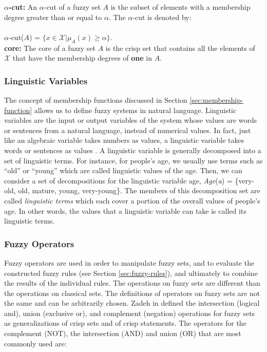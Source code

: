 \documentclass[11pt]{article}
\begin{document}
\textbf{$\alpha$-cut:} An $\alpha$-cut of a fuzzy set $\textit{A}$ is the subset
of elements with a membership degree greater than or equal to $\alpha$. The
$\alpha$-cut is denoted by:\\ \\$\alpha$-cut($\textit{A}$) = $\{\textit{x} \in
\mathcal{X} | \mu_A(\textit{x}) \geqslant \alpha\}$.\\

\textbf{core:} The core of a fuzzy set $\textit{A}$ is the crisp set that
contains all the elements of $\mathcal{X}$ that have the membership degrees of
\textbf{one} in $\textit{A}$.

\subsubsection{Linguistic Variables}
\label{sec:linguistic-variables}

The concept of membership functions discussed in Section
\ref{sec:membership-function} allows us to define fuzzy systems in natural
language. Linguistic variables are the input or output variables of the system
whose values are words or sentences from a natural language, instead of
numerical values. In fact, just like an algebraic variable takes numbers as
values, a linguistic variable takes words or sentences as values
\cite{zimmermann:fuzzy-sets}. A linguistic variable is generally decomposed into
a set of linguistic terms. For instance, for people's age, we usually use terms
such as ``old'' or ``young'' which are called linguistic values of the age.
Then, we can consider a set of decompositions for the linguistic variable age,
\textit{Age}(\textit{a}) = \{very-old, old, mature, young, very-young\}. The
members of this decomposition set are called \textit{linguistic terms} which
each cover a portion of the overall values of people's age. In other words, the
values that a linguistic variable can take is called its linguistic terms.

\subsubsection{Fuzzy Operators}

Fuzzy operators are used in order to manipulate fuzzy sets, and to evaluate the
constructed fuzzy rules (see Section \ref{sec:fuzzy-rules}), and ultimately to
combine the results of the individual rules. The operations on fuzzy sets are
different than the operations on classical sets. The definitions of operators on
fuzzy sets are not the same and can be arbitrarily chosen. Zadeh in
\cite{zadeh:fuzzy} defined the intersection (logical and), union (exclusive or),
and complement (negation) operations for fuzzy sets as generalizations of crisp
sets and of crisp statements. The operators for the complement (NOT), the
intersection (AND) and union (OR) that are most commonly used are:\\
\end{document}
